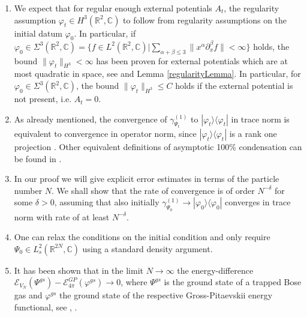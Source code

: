 \documentclass[11pt, english, american]{article}
\renewcommand{\phi}{\varphi}
\begin{document}
\begin{enumerate}

\item
We expect that for regular enough external potentials $A_t$, the regularity assumption $\phi_t  \in H^3(\mathbb{R}^2, \mathbb{C})$ to follow from
regularity assumptions on the initial datum
$\phi_0$. In particular,
if  $\phi_0  \in 
\Sigma^3(\mathbb{R}^2,\mathbb{C})
=
\lbrace
f \in L^2 (\mathbb{R}^2, \mathbb{C})|
\sum_{ \alpha+ \beta \leq 3} \|x^\alpha \partial_x^\beta f \| < \infty
\rbrace
$ holds,
the bound $\| \phi_t \|_{H^3} < \infty$  has been proven for external potentials which are at most quadratic in space, see \cite{carles} and Lemma  \ref{regularityLemma}. In particular, for $\phi_0 \in \Sigma^3(\mathbb{R}^2, \mathbb{C})$, the bound  $\| \phi_t \|_{H^3} \leq C$  holds if the external potential is not present, i.e. $A_t=0$.


\item 
As already mentioned, the convergence of $\gamma^{(1)}_{\Psi_t}$ to $|\phi_t\rangle\langle\phi_t|$ in trace norm is equivalent to convergence in operator norm, since $|\phi_t\rangle\langle\phi_t|$ is a rank
one projection \cite{rodnianskischlein}. 
Other equivalent definitions of asymptotic 100\% condensation can be found in \cite{michelangeli}.




\item
 In our proof we will give explicit error estimates in terms of the particle number $N$. We shall show that the rate of convergence is of order
$N^{-\delta}$ for some $\delta>0$, assuming that also initially $\gamma^{(1)}_{\Psi_0} \rightarrow|\phi_0\rangle\langle\phi_0|$ converges in trace norm with rate of at least $N^{-\delta}$. 

\item One can relax the conditions on the initial condition and only require $\Psi_0 \in L^2_{s}(\mathbb{R}^{2N}, \mathbb{C}) $ using a standard density argument. 
 
\item 
It has been shown that in the limit $N\to\infty$ the energy-difference $\mathcal{E}_{V_N}(\Psi^{gs})-\mathcal{E}_{4 \pi}^{GP}(\phi^{gs})\to0$, where $\Psi^{gs}$ is the ground state of a trapped Bose gas and $\phi^{gs}$  the ground state of the
respective Gross-Pitaevskii energy functional, see \cite{lsy}, \cite{ls}.



\end{enumerate}
\end{document}
